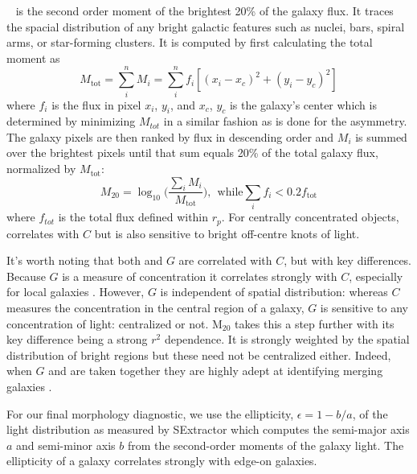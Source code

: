~\citep{Lotz2004} is the second order moment of the brightest 20\% of the galaxy flux. It traces the spacial distribution of any bright galactic features such as nuclei, bars, spiral arms, or star-forming clusters. It is computed by first calculating the total moment as
\begin{equation}
 M_{\mathrm{tot}} = \sum_i^n M_i = \sum_i^nf_i[(x_i-x_c)^2 + (y_i-y_c)^2] 
\end{equation}
where $f_i$ is the flux in pixel $x_i$, $y_i$, and $x_c$, $y_c$ is the galaxy's center which is determined by minimizing $M_{tot}$ in a similar fashion as is done for the asymmetry. The galaxy pixels are then ranked by flux in descending order and $M_i$ is summed over the brightest pixels until that sum equals 20\% of the total galaxy flux, normalized by $M_{\mathrm{tot}}$:
\begin{equation}
 M_{20} = \log_{10} \Big( \frac{\sum_iM_i}{M_{\mathrm{tot}}} \Big), ~~\textrm{while} \sum_if_i < 0.2f_{\mathrm{tot}}
\end{equation}
where $f_{tot}$ is the total flux defined within $r_p$. For centrally concentrated objects,  correlates with $C$ but is also sensitive to bright off-centre knots of light. 

It's worth noting that both  and $G$ are correlated with $C$, but with key differences. Because $G$ is a measure of concentration it correlates strongly with $C$, especially for local galaxies \cite{Abraham2003}. However, $G$ is independent of spatial distribution: whereas $C$ measures the concentration in the central region of a galaxy, $G$ is sensitive to any concentration of light: centralized or not. M$_{20}$ takes this a step further with its key difference being a strong $r^2$ dependence. It is strongly weighted by the spatial distribution of bright regions but these need not be centralized either.  Indeed, when $G$ and  are taken together they are highly adept at identifying merging galaxies \citep{Lotz2004}.  


For our final morphology diagnostic, we use the ellipticity, $\epsilon = 1 - b/a$, of the light distribution as measured by SExtractor which computes the semi-major axis $a$ and semi-minor axis $b$ from the second-order moments of the galaxy light. The ellipticity of a galaxy correlates strongly with edge-on galaxies. 

